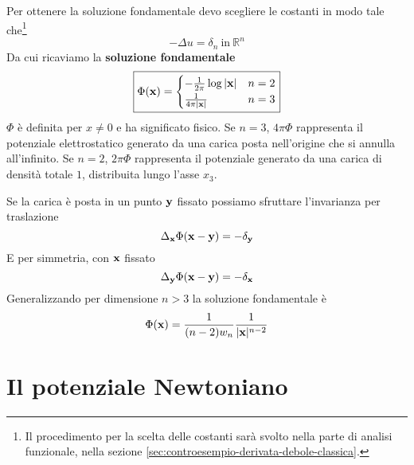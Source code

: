 Per ottenere la soluzione fondamentale devo scegliere le costanti in modo tale che\footnote{Il procedimento per la scelta delle costanti sarà svolto nella parte di analisi funzionale, nella sezione \ref{sec:controesempio-derivata-debole-classica}.}
\begin{equation*}
    -\Delta u=\delta _{n} \ \text{in} \ \mathbb{R}^{n}
\end{equation*}
Da cui ricaviamo la \textbf{soluzione fondamentale}
\begin{equation}
    \boxed{\Phi (\mathbf{x}) =
        \begin{cases}
            -\frac{1}{2\pi }\log|\mathbf{x}| & n=2 \\
            \frac{1}{4\pi |\mathbf{x}| }     & n=3
        \end{cases}}
\end{equation}
$\displaystyle \Phi $ è definita per $\displaystyle x\neq 0$ e ha significato fisico. Se $n=3$, $\displaystyle 4\pi \Phi $ rappresenta il potenziale elettrostatico generato da una carica posta nell'origine che si annulla all'infinito. Se $n=2$, $\displaystyle 2\pi \Phi $ rappresenta il potenziale generato da una carica di densità totale $1$, distribuita lungo l'asse $\displaystyle x_{3}$.

Se la carica è posta in un punto $\mathbf{y}$ fissato possiamo sfruttare l'invarianza per traslazione
\begin{equation*}
    \Delta _{\mathbf{x}} \Phi (\mathbf{x}-\mathbf{y}) =-\delta _{\mathbf{y}}
\end{equation*}
E per simmetria, con $\mathbf{x}$ fissato
\begin{equation*}
    \Delta _{\mathbf{y}} \Phi (\mathbf{x}-\mathbf{y}) =-\delta _{\mathbf{x}}
\end{equation*}
Generalizzando per dimensione $n >3$ la soluzione fondamentale è
\begin{equation*}
    \Phi (\mathbf{x}) =\frac{1}{(n-2) w_{n}}\frac{1}{|\mathbf{x}| ^{n-2}}
\end{equation*}
\section{Il potenziale Newtoniano}

